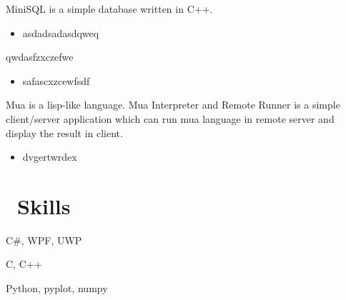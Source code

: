 \documentclass{resume}
\begin{document}
MiniSQL is a simple database written in C++.
\begin{itemize}
  \item asdadsadasdqweq
\end{itemize}

qwdasfzxczefwe
\begin{itemize}
  \item safascxzcewfsdf
\end{itemize}

Mua is a lisp-like language. 
Mua Interpreter and Remote Runner is a simple client/server application which can run mua language in remote server and display the result in client.
\begin{itemize}
  \item dvgertwrdex
\end{itemize}

\section{\faCogs\ Skills}
   C\#, WPF, UWP

   C, C++
   
  Python, pyplot, numpy
\end{document}
